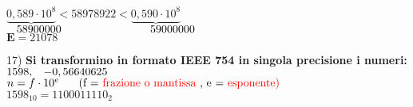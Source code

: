 \documentclass[a4paper, 12pt]{article} %
\begin{document}
$ \underbrace{0,589 \cdot 10^8} < 58978922 < \underbrace{0,590 \cdot 10^8} $ \\
$ \hspace{0.3cm}58900000 \hspace{2.8cm} 59000000 $ \\
\enlargethispage{12pt}
$ \mathbf{E } = 21078 $ 


\pagebreak

\textsf{\large{\color{red} 17) \textbf{\normalcolor Si transformino in formato IEEE 754 in singola precisione i numeri: $ 1598, \hspace{0.3cm} -0,56640625 $}}} \\

$ n = f \cdot 10^e \hspace{0.5cm} \text{ (f = \color{red} frazione o mantissa \normalcolor, e = \color{red} esponente)}$ \\

$ 1598_{10} = 1100011110_2 $ \\
\end{document}
